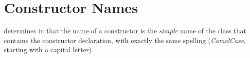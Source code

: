 \section{Constructor Names}\label{sec:NamesForConstructors}
\jls determines in \autocite{ORACLE_DOC_LANGUAGE_SPECIFICATION:ConstructorDeclaration} that the name of a constructor is the \textit{simple} name of the class that contains the constructor declaration, with exactly the same spelling (\textit{CamelCase}, starting with a capital letter). 

